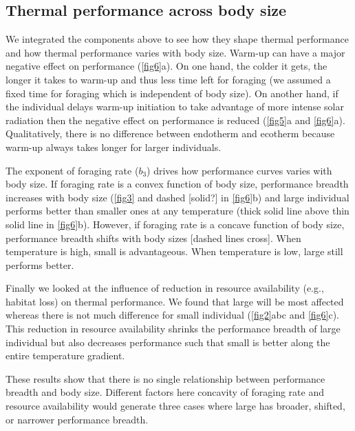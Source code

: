 \subsection*{Thermal performance across body size}
 We integrated the components above to see how they shape thermal performance and how thermal performance varies with body size.
Warm-up can have a major negative effect on performance (\cref{fig6}a).
On one hand, the colder it gets, the longer it takes to warm-up and thus less time left for foraging (we assumed a fixed time for foraging which is independent of body size).
On another hand, if the individual delays warm-up initiation to take advantage of more intense solar radiation then the negative effect on performance is reduced (\cref{fig5}a and \cref{fig6}a). %
Qualitatively, there is no difference between endotherm and ecotherm because warm-up always takes longer for larger individuals. 

The exponent of foraging rate ($b_3$) drives how performance curves varies with body size.
If foraging rate is a convex function of body size, performance breadth increases with body size (\cref{fig3} and dashed [solid?] in \cref{fig6}b) and  large individual performs better than smaller ones at any temperature (thick solid line above thin solid line in \cref{fig6}b).
However, if foraging rate is a concave function of body size, performance breadth shifts with body sizes [dashed lines cross].
When temperature is high, small is advantageous.
When temperature  is low, large still performs better.
   
Finally we looked at the influence of reduction in resource availability (e.g., habitat loss) on thermal performance.
We found that large will be most affected whereas there is not much difference for small individual (\cref{fig2}abc and \cref{fig6}c).
This reduction in resource availability shrinks the performance breadth of large individual but also decreases performance such that small is better along the entire temperature gradient.

These results show that there is no single relationship between performance breadth and body size. 
Different factors here concavity of foraging  rate and resource availability would generate three cases where large has broader, shifted, or narrower performance breadth.
